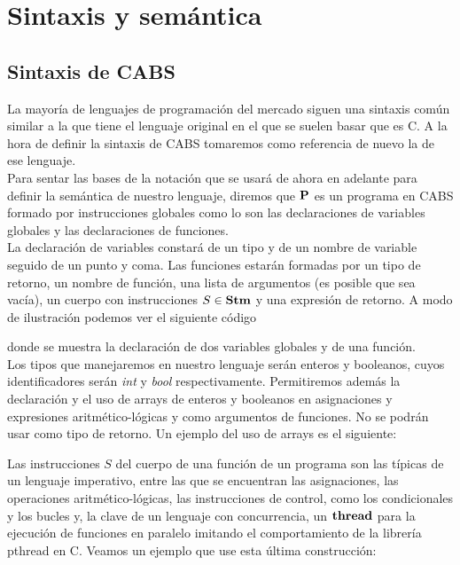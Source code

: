 \chapter{Sintaxis y semántica}
\section{Sintaxis de CABS}
La mayoría de lenguajes de programación del mercado siguen una sintaxis común similar a la que tiene el lenguaje original en el que se suelen basar que es C. A la hora de definir la sintaxis de CABS tomaremos como referencia de nuevo la de ese lenguaje.\\

Para sentar las bases de la notación que se usará de ahora en adelante para definir la semántica de nuestro lenguaje, diremos que $\P$ es un programa en CABS formado por instrucciones globales como lo son las declaraciones de variables globales y las declaraciones de funciones.\\

La declaración de variables constará de un tipo y de un nombre de variable seguido de un punto y coma. Las funciones estarán formadas por un tipo de retorno, un nombre de función, una lista de argumentos (es posible que sea vacía), un cuerpo con instrucciones $S \in \Stm$ y una expresión de retorno. A modo de ilustración podemos ver el siguiente código



donde se muestra la declaración de dos variables globales y de una función.\\

Los tipos que manejaremos en nuestro lenguaje serán enteros y booleanos, cuyos identificadores serán \emph{int} y \emph{bool} respectivamente. Permitiremos además la declaración y el uso de arrays de enteros y booleanos en asignaciones y expresiones aritmético-lógicas y como argumentos de funciones. No se podrán usar como tipo de retorno. Un ejemplo del uso de arrays es el siguiente:



Las instrucciones $S$ del cuerpo de una función de un programa son las típicas de un lenguaje imperativo, entre las que se encuentran las asignaciones, las operaciones aritmético-lógicas, las instrucciones de control, como los condicionales y los bucles y, la clave de un lenguaje con concurrencia, un $\thread$ para la ejecución de funciones en paralelo imitando el comportamiento de la librería pthread en C. Veamos un ejemplo que use esta última construcción:

